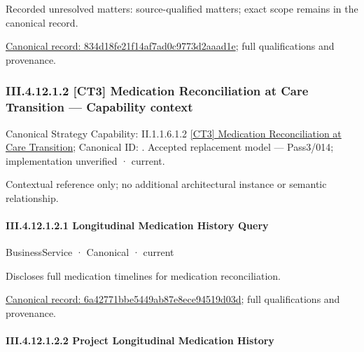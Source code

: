 {\small Recorded unresolved matters: source-qualified matters; exact scope remains in the canonical record.}\par
{\footnotesize \href{../../../../../../../../continuum/business/business-function/834d18fe21f14af7ad0c9773d2aaad1e.md}{Canonical record: 834d18fe21f14af7ad0c9773d2aaad1e}; full qualifications and provenance.}\par
\subsubsection*{III.4.12.1.2 [CT3] Medication Reconciliation at Care Transition — Capability context}
\label{navigation:III.4.12.1.2}

{\small Canonical Strategy Capability: II.1.1.6.1.2 \hyperref[element:f7b8e469f8834d3ebdf6451f489310e9]{[CT3] Medication Reconciliation at Care Transition}; Canonical ID: \texttt{}. Accepted replacement model — Pass3/014; implementation unverified · current.}\par
Contextual reference only; no additional architectural instance or semantic relationship.\par
\paragraph*{III.4.12.1.2.1 Longitudinal Medication History Query}
\label{navigation:III.4.12.1.2.1}

\label{element:6a42771bbe5449ab87e8ece94519d03d}
{\small BusinessService · Canonical · current}\par

Discloses full medication timelines for medication reconciliation.


{\footnotesize \href{../../../../../../../../continuum/business/business-service/6a42771bbe5449ab87e8ece94519d03d.md}{Canonical record: 6a42771bbe5449ab87e8ece94519d03d}; full qualifications and provenance.}\par
\paragraph*{III.4.12.1.2.2 Project Longitudinal Medication History}
\label{navigation:III.4.12.1.2.2}

